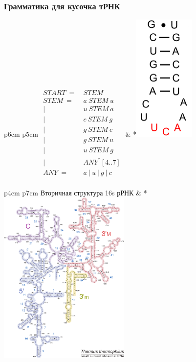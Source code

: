 \documentclass{beamer}
\begin{document}
\begin{frame}
    \frametitle{Грамматика для кусочка тРНК}
        \begin{tabular}{p{6cm} p{5cm}}
            {$\begin{aligned}
                START\ =&\ STEM \\
                STEM\ =&\ a\ STEM\ u \\
                      |&\ u\ STEM\ a \\
                      |&\ c\ STEM\ g \\
                      |&\ g\ STEM\ c \\
                      |&\ g\ STEM\ u \\
                      |&\ u\ STEM\ g \\
                      |&\ ANY^{*}[4..7] \\
                ANY\ =&\ a\ |\ u\ |\ g\ |\ c \\
                \end{aligned}$}
            &
            *{\includegraphics[width=3cm]{pictures/TRNAPart.png}}
        \end{tabular}
\end{frame}

\begin{frame}
    \begin{tabular}{p{4cm} p{7cm}}
        Вторичная структура 16s рРНК
        &
        *{\includegraphics[width=6.5cm]{pictures/thermus_16s_2ndry.pdf}}
    \end{tabular}
\end{frame}
\end{document}
